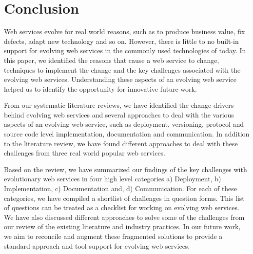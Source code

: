 \documentclass[runningheads,a4paper]{llncs}
\begin{document}
\section{Conclusion} %
\label{sec:conclusion}
Web services evolve for real world reasons, such as to produce business value, fix defects, adapt new technology and so on. However, there is little to no built-in support for evolving web services in the commonly used technologies of today. In this paper, we identified the reasons that cause a web service to change, techniques to implement the change and the key challenges associated with the evolving web services. Understanding these aspects of an evolving web service helped us to identify the opportunity for innovative future work.

From our systematic literature reviews, we have identified the change drivers behind evolving web services and several approaches to deal with the various aspects of an evolving web service, such as deployment, versioning, protocol and source code level implementation, documentation and communication. In addition to the literature review, we have found different approaches to deal with these challenges from three real world popular web services.

Based on the review, we have summarized our findings of the key challenges with evolutionary web services in four high level categories a) Deployment, b) Implementation, c) Documentation and, d) Communication. For each of these categories, we have compiled a shortlist of challenges in question forms. This list of questions can be treated as a checklist for working on evolving web services. We have also discussed different approaches to solve some of the challenges from our review of the existing literature and industry practices. In our future work, we aim to reconcile and augment these fragmented solutions to provide a standard approach and tool support for evolving web services.



\end{document}
